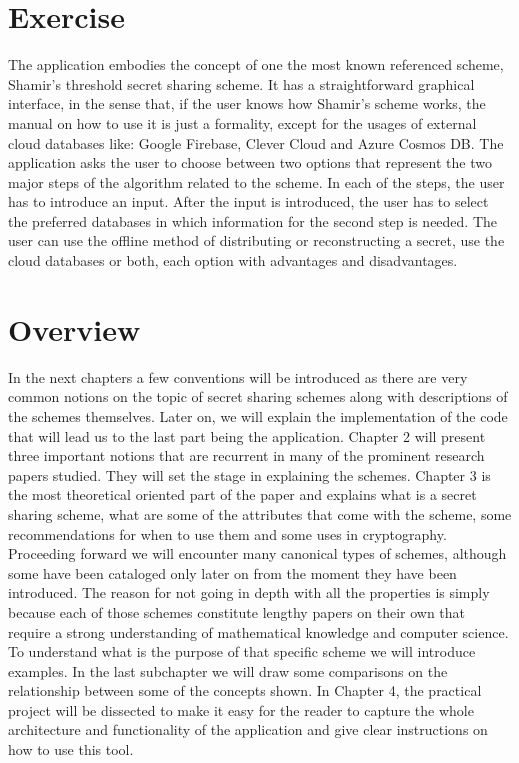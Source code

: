 \documentclass[12pt, a4paper, oneside]{book}
\begin{document}
    \section{Exercise} 
    The application embodies the concept of one the most known referenced scheme, Shamir's threshold secret sharing scheme. It has a straightforward graphical interface, in the sense that, if the user knows how Shamir's scheme works, the manual on how to use it is just a formality, except for the usages of external cloud databases like: Google Firebase, Clever Cloud and Azure Cosmos DB. The application asks the user to choose between two options that represent the two major steps of the algorithm related to the scheme. In each of the steps, the user has to introduce an input. After the input is introduced, the user has to select the preferred databases in which information for the second step is needed. The user can use the offline method of distributing or reconstructing a secret, use the cloud databases or both, each option with advantages and disadvantages.
    \section{Overview} In the next chapters a few conventions will be introduced as there are very common notions on the topic of secret sharing schemes along with descriptions of the schemes themselves. Later on, we will explain the implementation of the code that will lead us to the last part being the application.
    Chapter 2 will present three important notions that are recurrent in many of the prominent research papers studied. They will set the stage in explaining the schemes. Chapter 3 is the most theoretical oriented part of the paper and explains what is a secret sharing scheme, what are some of the attributes that come with the scheme, some recommendations for when to use them and some uses in cryptography. Proceeding forward we will encounter many canonical types of schemes, although some have been cataloged only later on from the moment they have been introduced. The reason for not going in depth with all the properties is simply because each of those schemes constitute lengthy papers on their own that require a strong understanding of mathematical knowledge and computer science. To understand what is the purpose of that specific scheme we will introduce examples. In the last subchapter we will draw some comparisons on the relationship between some of the concepts shown. In Chapter 4, the practical project will be dissected to make it easy for the reader to capture the whole architecture and functionality of the application and give clear instructions on how to use this tool.
    
\end{document}
